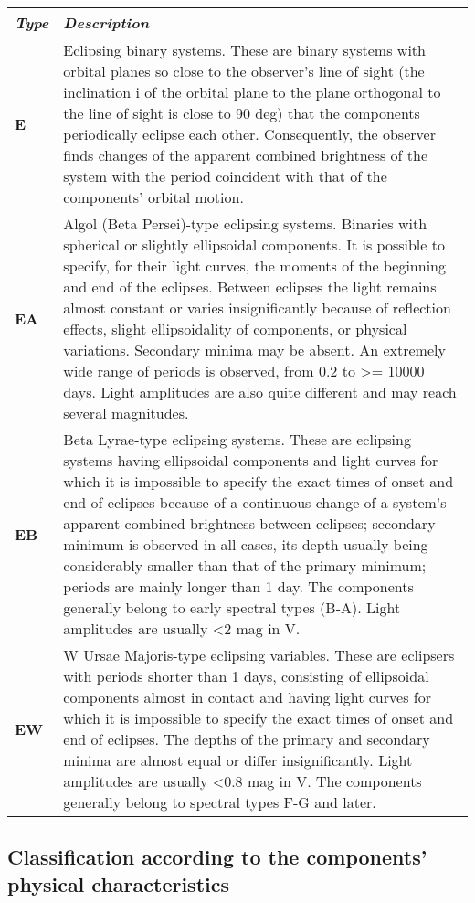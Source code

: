 \begin{longtabu} to \textwidth {l|X}
\toprule
\emph{Type} & \emph{Description}\tabularnewline
\midrule
\textbf{E} & Eclipsing binary systems. These are binary systems with
orbital planes so close to the observer's line of sight (the inclination
i of the orbital plane to the plane orthogonal to the line of sight is
close to 90 deg) that the components periodically eclipse each other.
Consequently, the observer finds changes of the apparent combined
brightness of the system with the period coincident with that of the
components' orbital motion.\tabularnewline
\textbf{EA} & Algol (Beta Persei)-type eclipsing systems. Binaries with
spherical or slightly ellipsoidal components. It is possible to specify,
for their light curves, the moments of the beginning and end of the
eclipses. Between eclipses the light remains almost constant or varies
insignificantly because of reflection effects, slight ellipsoidality of
components, or physical variations. Secondary minima may be absent. An
extremely wide range of periods is observed, from 0.2 to \textgreater{}=
10000 days. Light amplitudes are also quite different and may reach
several magnitudes.\tabularnewline
\textbf{EB} & Beta Lyrae-type eclipsing systems. These are eclipsing
systems having ellipsoidal components and light curves for which it is
impossible to specify the exact times of onset and end of eclipses
because of a continuous change of a system's apparent combined
brightness between eclipses; secondary minimum is observed in all cases,
its depth usually being considerably smaller than that of the primary
minimum; periods are mainly longer than 1 day. The components generally
belong to early spectral types (B-A). Light amplitudes are usually
\textless{}2 mag in V.\tabularnewline
\textbf{EW} & W Ursae Majoris-type eclipsing variables. These are
eclipsers with periods shorter than 1 days, consisting of ellipsoidal
components almost in contact and having light curves for which it is
impossible to specify the exact times of onset and end of eclipses. The
depths of the primary and secondary minima are almost equal or differ
insignificantly. Light amplitudes are usually \textless{}0.8 mag in V.
The components generally belong to spectral types F-G and
later.\tabularnewline
\bottomrule
\end{longtabu}

\subsection{Classification according to the components' physical
characteristics}\label{classification-according-to-the-components-physical-characteristics}


